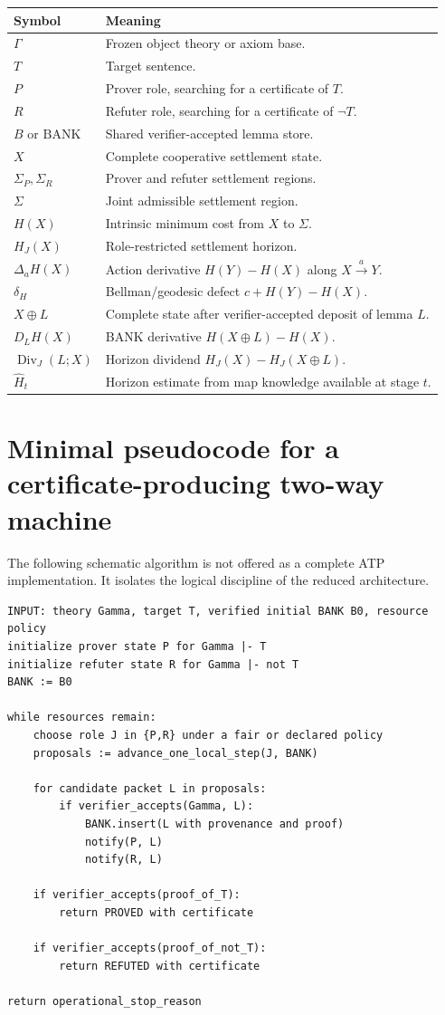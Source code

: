 \documentclass[11pt]{article}
\theoremstyle{remark}
\newcommand{\BANK}{\ensuremath{\mathrm{BANK}}}
\begin{document}
\begin{longtable}{p{}p{}}
\toprule
Symbol & Meaning\\
\midrule
\endhead
$\Gamma$ & Frozen object theory or axiom base.\\
$T$ & Target sentence.\\
$P$ & Prover role, searching for a certificate of $T$.\\
$R$ & Refuter role, searching for a certificate of $\neg T$.\\
$B$ or $\BANK$ & Shared verifier-accepted lemma store.\\
$X$ & Complete cooperative settlement state.\\
$\Sigma_P,\Sigma_R$ & Prover and refuter settlement regions.\\
$\Sigma$ & Joint admissible settlement region.\\
$H(X)$ & Intrinsic minimum cost from $X$ to $\Sigma$.\\
$H_J(X)$ & Role-restricted settlement horizon.\\
$\Delta_aH(X)$ & Action derivative $H(Y)-H(X)$ along $X\xrightarrow{a}Y$.\\
$\delta_H$ & Bellman/geodesic defect $c+H(Y)-H(X)$.\\
$X\oplus L$ & Complete state after verifier-accepted deposit of lemma $L$.\\
$D_LH(X)$ & BANK derivative $H(X\oplus L)-H(X)$.\\
$\operatorname{Div}_J(L;X)$ & Horizon dividend $H_J(X)-H_J(X\oplus L)$.\\
$\widehat H_t$ & Horizon estimate from map knowledge available at stage $t$.\\
\bottomrule
\end{longtable}

\section{Minimal pseudocode for a certificate-producing two-way machine}

The following schematic algorithm is not offered as a complete ATP implementation. It isolates the logical discipline of the reduced architecture.

\begin{verbatim}
INPUT: theory Gamma, target T, verified initial BANK B0, resource policy
initialize prover state P for Gamma |- T
initialize refuter state R for Gamma |- not T
BANK := B0

while resources remain:
    choose role J in {P,R} under a fair or declared policy
    proposals := advance_one_local_step(J, BANK)

    for candidate packet L in proposals:
        if verifier_accepts(Gamma, L):
            BANK.insert(L with provenance and proof)
            notify(P, L)
            notify(R, L)

    if verifier_accepts(proof_of_T):
        return PROVED with certificate

    if verifier_accepts(proof_of_not_T):
        return REFUTED with certificate

return operational_stop_reason
\end{verbatim}
\end{document}
